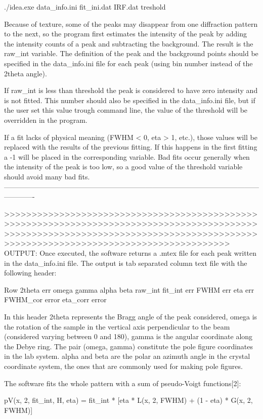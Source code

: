 ./idea.exe data_info.ini fit_ini.dat IRF.dat treshold

Because of texture, some of the peaks may disappear from one diffraction pattern to the next, so the program first estimates the intensity of the peak by adding the intensity counts of a peak and subtracting the background. The result is the raw_int variable. The definition of the peak and the background points should be specified in the data_info.ini file for each peak (using bin number instead of the 2theta angle).

If raw_int is less than threshold the peak is considered to have zero intensity and is not fitted. This number should also be specified in the data_info.ini file, but if the user set this value trough command line, the value of the threshold will be overridden in the program.

If a fit lacks of physical meaning (FWHM < 0, eta > 1, etc.), those values will be replaced with the results of the previous fitting. If this happens in the first fitting a -1 will be placed in the corresponding variable. Bad fits occur generally when the intensity of the peak is too low, so a good value of the threshold variable should avoid many bad fits.
-------------------------------------------------------------------------------------------------------------------------

>>>>>>>>>>>>>>>>>>>>>>>>>>>>>>>>>>>>>>>>>>>>>>>>>>>>>>>>>>>>>>>>>>>>>>>>>>>>>>>>>>>>>>>>>>>>>>>>>>>>>>>>>>>>>>>>>>>>>>>>>>>>>>>>>>>>>>>>>>>>>>>>>>>>>>>>>>>>>>>>>>>>>>>>>>>>>>>>>>>
OUTPUT:
Once executed, the software returns a .mtex file for each peak written in the data_info.ini file. The output is tab separated column text file with the following
header:

Row 2theta err  omega gamma alpha  beta raw_int fit_int  err FWHM err eta err FWHM_cor error eta_corr error

In this header 2theta represents the Bragg angle of the peak considered, omega is the rotation of the sample in the vertical axis perpendicular to the beam (considered varying between 0 and 180), gamma is the angular coordinate along the Debye ring. The pair (omega, gamma) constitute the pole figure coordinates in the lab system. alpha and beta are the polar an azimuth angle in the crystal coordinate system, the ones that are commonly used for making pole figures.

The software fits the whole pattern with a sum of pseudo-Voigt functions[2]:

    pV(x, 2\theta, fit_int, H, eta) = fit_int * [eta * L(x, 2\theta, FWHM) + (1 - eta) * G(x, 2\theta, FWHM)]

